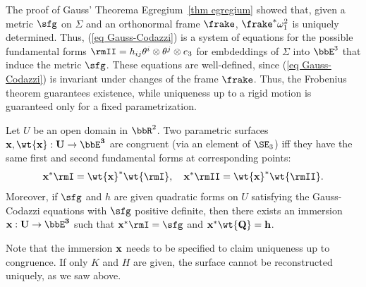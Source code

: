 The proof of Gauss' Theorema Egregium~\ref{thm egregium} showed that, given a metric $\sfg$ on $\Sigma$ and an orthonormal frame $\frake$, $\frake^\ast \omega_1^2$ is uniquely determined. Thus, (\ref{eq Gauss-Codazzi}) is a system of equations for the possible fundamental forms $\rmII=h_{ij}\theta^i\otimes \theta^j\otimes e_3$ for embdeddings of $\Sigma$ into $\bbE^3$ that induce the metric $\sfg$. These equations are well-defined, since (\ref{eq Gauss-Codazzi}) is invariant under changes of the frame $\frake$. Thus, the Frobenius theorem guarantees existence, while uniqueness up to a rigid motion is guaranteed only for a fixed parametrization.

\begin{thm}
    Let $U$ be an open domain in $\bbR^2$. Two parametric surfaces $\bf{x},\wt{\bf{x}}:U\to \bbE^3$ are congruent (via an element of $\SE_3$) iff they have the same first and second fundamental forms at corresponding points:
    \[\bf{x}^\ast\rmI=\wt{\bf{x}}^\ast \wt{\rmI},\quad \bf{x}^\ast\rmII=\wt{\bf{x}}^\ast \wt{\rmII}.\] 
    Moreover, if $\sfg$ and $h$ are given quadratic forms on $U$ satisfying the Gauss-Codazzi equations with $\sfg$ positive definite, then there exists an immersion $\bf{x}:U\to \bbE^3$ such that $\bf{x}^\ast  \rmI=\sfg$ and $\bf{x}^\ast  \wt{Q}=h$.
\end{thm}
Note that the immersion $\bf{x}$ needs to be specified to claim uniqueness up to congruence. If only $K$ and $H$ are given, the surface cannot be reconstructed uniquely, as we saw above.
